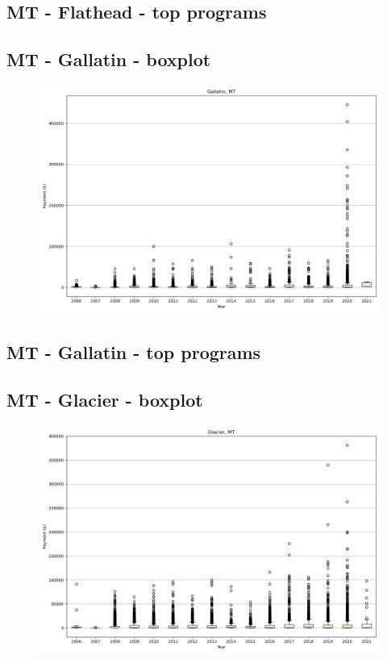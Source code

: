 \subsection*{MT - Flathead - top programs}

\newpage
\subsection*{MT - Gallatin - boxplot}
\begin{figure}[h]
\centering
\includegraphics[width=7in]{../output/boxplots/counties/Gallatin-MT_boxplot.png}
\end{figure}


\subsection*{MT - Gallatin - top programs}

\newpage
\subsection*{MT - Glacier - boxplot}
\begin{figure}[h]
\centering
\includegraphics[width=7in]{../output/boxplots/counties/Glacier-MT_boxplot.png}
\end{figure}


